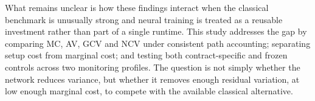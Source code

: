 What remains unclear is how these findings interact when the classical benchmark is unusually strong and neural training is treated as a reusable investment rather than part of a single runtime. This study addresses the gap by comparing MC, AV, GCV and NCV under consistent path accounting; separating setup cost from marginal cost; and testing both contract-specific and frozen controls across two monitoring profiles. The question is not simply whether the network reduces variance, but whether it removes enough residual variation, at low enough marginal cost, to compete with the available classical alternative.
